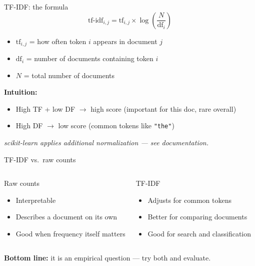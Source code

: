\documentclass[handout]{beamer}
\begin{document}
\begin{frame}{TF-IDF: the formula}
\[
\text{tf-idf}_{i,j} = \text{tf}_{i,j} \times \log \left(\frac{N}{\text{df}_i}\right)
\]

\begin{itemize}
    \item $\text{tf}_{i,j}$ = how often token $i$ appears in document $j$
    \item $\text{df}_i$ = number of documents containing token $i$
    \item $N$ = total number of documents
\end{itemize}

\vspace{0.5em}
\textbf{Intuition:}
\begin{itemize}
    \item High TF + low DF $\rightarrow$ high score (important for this doc, rare overall)
    \item High DF $\rightarrow$ low score (common tokens like \texttt{"the"})
\end{itemize}

\small \emph{scikit-learn applies additional normalization --- see documentation.}
\end{frame}

\begin{frame}{TF-IDF vs.\ raw counts}
\begin{columns}
\begin{block}{Raw counts}
\begin{itemize}
    \item Interpretable
    \item Describes a document on its own
    \item Good when frequency itself matters
\end{itemize}
\end{block}
\begin{block}{TF-IDF}
\begin{itemize}
    \item Adjusts for common tokens
    \item Better for comparing documents
    \item Good for search and classification
\end{itemize}
\end{block}
\end{columns}

\vspace{0.5em}
\textbf{Bottom line:} it is an empirical question --- try both and evaluate.
\end{frame}
\end{document}
